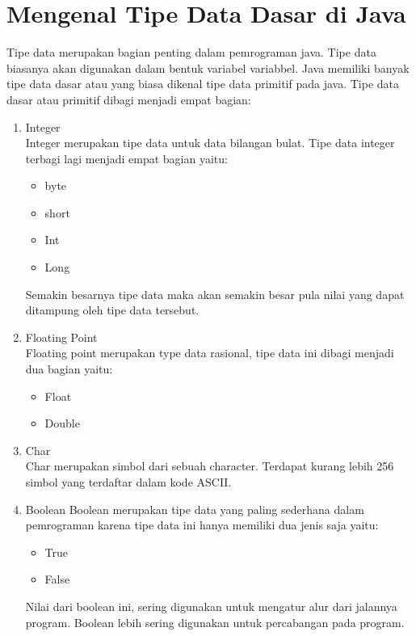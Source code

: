 \section{Mengenal Tipe Data Dasar di Java}
Tipe data merupakan bagian penting dalam pemrograman java. Tipe data biasanya akan digunakan dalam bentuk variabel variabbel. Java memiliki banyak tipe data dasar atau yang biasa dikenal tipe data primitif pada java. Tipe data dasar atau primitif dibagi menjadi empat bagian:
\begin{enumerate}
    \item Integer\\
    Integer merupakan tipe data untuk data bilangan bulat. Tipe data integer terbagi lagi menjadi empat bagian yaitu:
    \begin{itemize}
        \item byte
        \item short
        \item Int
        \item Long
    \end{itemize}
    Semakin besarnya tipe data maka akan semakin besar pula nilai yang dapat ditampung oleh tipe data tersebut.

    \item Floating Point\\
    Floating point merupakan type data rasional, tipe data ini dibagi menjadi dua bagian yaitu:
    \begin{itemize}
        \item Float
        \item Double 
    \end{itemize}

    \item Char\\
    Char merupakan simbol dari sebuah character. Terdapat kurang lebih 256 simbol yang terdaftar  dalam kode ASCII. 

    \medskip

    \noindent{}

    \medskip

    \item Boolean
    Boolean merupakan tipe data yang paling sederhana dalam pemrograman karena tipe data ini hanya memiliki dua jenis saja yaitu:
    \begin{itemize}
        \item True
        \item False
    \end{itemize}
    Nilai dari boolean ini, sering digunakan untuk mengatur alur dari jalannya program. Boolean lebih sering digunakan untuk percabangan pada program.
    \cite{ahmadi1}
    
\end{enumerate}

